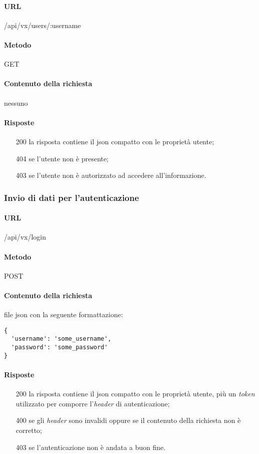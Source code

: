 \paragraph{URL}
/api/vx/users/:username
\paragraph{Metodo}
GET
\paragraph{Contenuto della richiesta}
nessuno
\paragraph{Risposte}
\begin{itemize}
	\item[200] la risposta contiene il \gls{json} compatto con le proprietà utente;
	\item[404] se l'utente non è presente;
	\item[403] se l'utente non è autorizzato ad accedere all'informazione.
\end{itemize}


\subsubsection{Invio di dati per l'autenticazione}
\paragraph{URL}
/api/vx/login
\paragraph{Metodo}
POST
\paragraph{Contenuto della richiesta}
file \gls{json} con la seguente formattazione:
\begin{verbatim}
{
  'username': 'some_username',
  'password': 'some_password'
}
\end{verbatim}
\paragraph{Risposte}
\begin{itemize}
	\item[200] la risposta contiene il \gls{json} compatto con le proprietà utente, più un \emph{token} utilizzato per comporre l'\emph{header} di autenticazione;
	\item[400] se gli \emph{header} sono invalidi oppure se il contenuto della richiesta non è corretto;
	\item[403] se l'autenticazione non è andata a buon fine.
\end{itemize}

